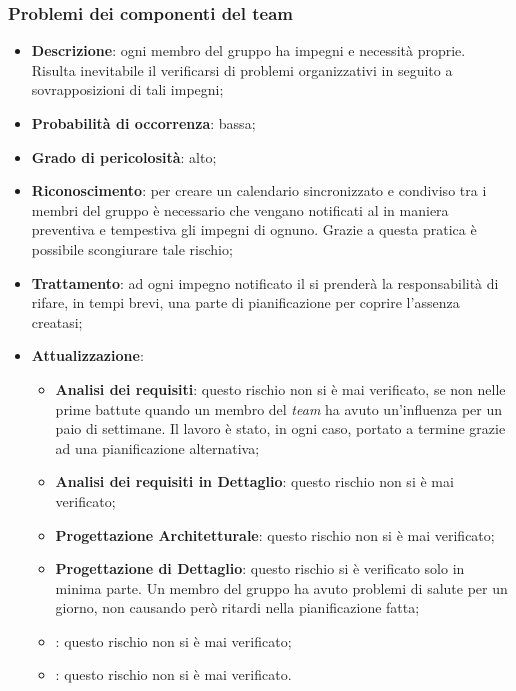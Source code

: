 		\subsubsection{Problemi dei componenti del team}
		\begin{itemize}
			\item \textbf{Descrizione}: ogni membro del gruppo ha impegni e necessità proprie. Risulta inevitabile il verificarsi di problemi organizzativi in seguito a sovrapposizioni di tali impegni;
			\item \textbf{Probabilità di occorrenza}: bassa;
			\item \textbf{Grado di pericolosità}: alto;
			\item \textbf{Riconoscimento}: per creare un calendario sincronizzato e condiviso tra i membri del gruppo è necessario che vengano notificati al \textit{\Res} in maniera preventiva e tempestiva gli impegni di ognuno. Grazie a questa pratica è possibile scongiurare tale rischio;
			\item \textbf{Trattamento}: ad ogni impegno notificato il \textit{\Res} si prenderà la responsabilità di rifare, in tempi brevi, una parte di pianificazione per coprire l'assenza creatasi;
			\item \textbf{Attualizzazione}:
			\begin{itemize}
				\item \textbf{Analisi dei requisiti}: questo rischio non si è mai verificato, se non nelle prime battute quando un membro del \textit{team} ha avuto un'influenza per un paio di settimane. Il lavoro è stato, in ogni caso, portato a termine grazie ad una pianificazione alternativa;
				\item \textbf{Analisi dei requisiti in Dettaglio}: questo rischio non si è mai verificato;
				\item \textbf{Progettazione Architetturale}: questo rischio non si è mai verificato;
				\item \textbf{Progettazione di Dettaglio}: questo rischio si è verificato solo in minima parte. Un membro del gruppo ha avuto problemi di salute per un giorno, non causando però ritardi nella pianificazione fatta;
				\item \textbf{\CO}: questo rischio non si è mai verificato;
				\item \textbf{\VV}: questo rischio non si è mai verificato. 
			\end{itemize}
		\end{itemize}
		
